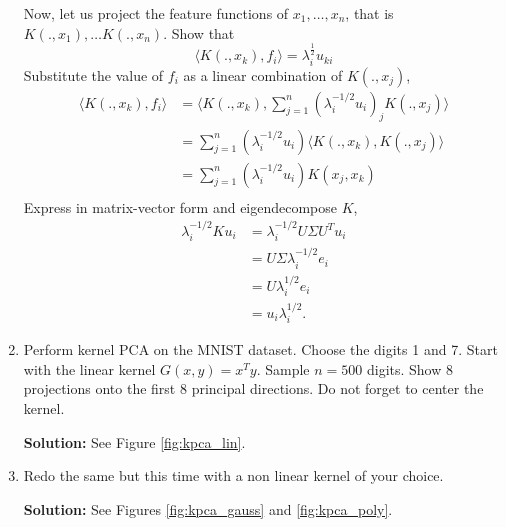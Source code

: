 \documentclass{article}[12pt]
\begin{document}
\begin{enumerate}
Now, let us project the feature functions of $x_1,\ldots,x_n$, that is $K(.,x_1), \ldots K(.,x_n)$. Show that 
 \begin{equation}
\langle K(.,x_k),f_i \rangle = \lambda_i^\frac{1}{2} u_{ki}
\end{equation}
Substitute the value of $f_i$ as a linear combination of $K(., x_j)$,
\begin{equation}
	\begin{aligned}
		\langle K(., x_k), f_i \rangle &= \langle K(., x_k), \sum^{n}_{j=1} \left( \lambda_i^{-1/2} u_i \right)_j K(.,x_j)  \rangle	\\
					       &= \sum^{n}_{j=1} \left( \lambda^{-1/2}_i u_i \right) \langle K(., x_k), K(., x_j) \rangle \\
					       &= \sum^{n}_{j=1} \left( \lambda_{i}^{-1/2} u_i \right) K(x_j, x_k) \\
	\end{aligned}
\end{equation}
Express in matrix-vector form and eigendecompose $K$,
\begin{equation}
	\begin{aligned}
	\lambda_i^{-1/2}K u_i &= \lambda^{-1/2}_i U \Sigma U^T u_i \\
			      &= U \Sigma \lambda_i^{-1/2} e_i \\
			      &= U \lambda_i^{1/2} e_i \\
			      &= u_i \lambda_i^{1/2}. 
	\end{aligned}
\end{equation}


\item Perform kernel PCA on the MNIST dataset. Choose the digits 1 and 7. Start with the linear kernel $G(x,y)=x^Ty$. Sample $n=500$ digits. Show 8 projections onto the first 8 principal directions. Do not forget to center the kernel. 

	\textbf{Solution:} See Figure \ref{fig:kpca_lin}.

\item Redo the same but this time with a non linear kernel of your choice.

	\textbf{Solution:} See Figures \ref{fig:kpca_gauss} and \ref{fig:kpca_poly}.


\end{enumerate}
\end{document}
